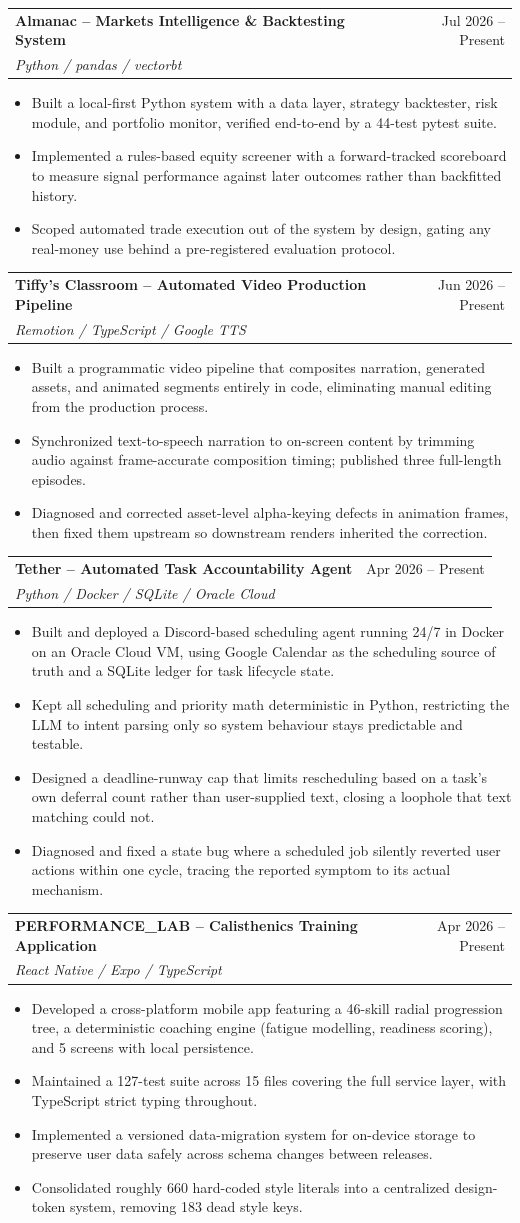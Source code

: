 \documentclass[letterpaper,11pt]{article}
\makeatletter
\newcommand{\resumeItem}[1]{\item\small{{#1 \vspace{-2pt}}}}
\newcommand{\resumeSubheading}[4]{
  \vspace{-2pt}\item
    \begin{tabular*}{0.97\textwidth}[t]{l@{\extracolsep{\fill}}r}
      \textbf{#1} & #2 \\
      \textit{\small #3} & \textit{\small #4} \\
    \end{tabular*}\vspace{-7pt}
}
\newcommand{\resumeItemListStart}{\begin{itemize}}
\newcommand{\resumeItemListEnd}{\end{itemize}\vspace{-5pt}}
\makeatother
\begin{document}
\resumeSubheading
  {Almanac -- Markets Intelligence \& Backtesting System}{Jul 2026 -- Present}
  {Python / pandas / vectorbt}{ }
\resumeItemListStart
  \resumeItem{Built a local-first Python system with a data layer, strategy backtester, risk module, and portfolio monitor, verified end-to-end by a 44-test pytest suite.}
  \resumeItem{Implemented a rules-based equity screener with a forward-tracked scoreboard to measure signal performance against later outcomes rather than backfitted history.}
  \resumeItem{Scoped automated trade execution out of the system by design, gating any real-money use behind a pre-registered evaluation protocol.}
\resumeItemListEnd

\resumeSubheading
  {Tiffy's Classroom -- Automated Video Production Pipeline}{Jun 2026 -- Present}
  {Remotion / TypeScript / Google TTS}{ }
\resumeItemListStart
  \resumeItem{Built a programmatic video pipeline that composites narration, generated assets, and animated segments entirely in code, eliminating manual editing from the production process.}
  \resumeItem{Synchronized text-to-speech narration to on-screen content by trimming audio against frame-accurate composition timing; published three full-length episodes.}
  \resumeItem{Diagnosed and corrected asset-level alpha-keying defects in animation frames, then fixed them upstream so downstream renders inherited the correction.}
\resumeItemListEnd

\resumeSubheading
  {Tether -- Automated Task Accountability Agent}{Apr 2026 -- Present}
  {Python / Docker / SQLite / Oracle Cloud}{ }
\resumeItemListStart
  \resumeItem{Built and deployed a Discord-based scheduling agent running 24/7 in Docker on an Oracle Cloud VM, using Google Calendar as the scheduling source of truth and a SQLite ledger for task lifecycle state.}
  \resumeItem{Kept all scheduling and priority math deterministic in Python, restricting the LLM to intent parsing only so system behaviour stays predictable and testable.}
  \resumeItem{Designed a deadline-runway cap that limits rescheduling based on a task's own deferral count rather than user-supplied text, closing a loophole that text matching could not.}
  \resumeItem{Diagnosed and fixed a state bug where a scheduled job silently reverted user actions within one cycle, tracing the reported symptom to its actual mechanism.}
\resumeItemListEnd

\resumeSubheading
  {PERFORMANCE\_LAB -- Calisthenics Training Application}{Apr 2026 -- Present}
  {React Native / Expo / TypeScript}{ }
\resumeItemListStart
  \resumeItem{Developed a cross-platform mobile app featuring a 46-skill radial progression tree, a deterministic coaching engine (fatigue modelling, readiness scoring), and 5 screens with local persistence.}
  \resumeItem{Maintained a 127-test suite across 15 files covering the full service layer, with TypeScript strict typing throughout.}
  \resumeItem{Implemented a versioned data-migration system for on-device storage to preserve user data safely across schema changes between releases.}
  \resumeItem{Consolidated roughly 660 hard-coded style literals into a centralized design-token system, removing 183 dead style keys.}
\resumeItemListEnd
\end{document}
